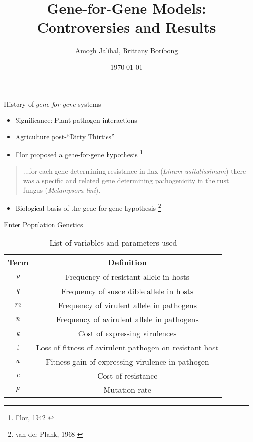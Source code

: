 \documentclass[presentation]{beamer}
\author[Boribong, Jalihal]{Amogh Jalihal, Brittany Boribong}
\date{\today}
\title{Gene-for-Gene Models: Controversies and Results}
\begin{document}
\maketitle
\begin{frame}[label=sec-1]{History of \emph{gene-for-gene} systems}
  \begin{itemize}
  \item Significance: Plant-pathogen interactions
  \item Agriculture post-``Dirty Thirties''
  \item Flor proposed a gene-for-gene hypothesis \footnote{\tiny{Flor, 1942 \cite{flor1942complementary}}}
  \end{itemize}
    \begin{quotation}
      ...for each gene determining resistance in flax (\emph{Linum usitatissimum}) there was a specific and related gene determining pathogenicity in the rust fungus (\emph{Melampsora lini}). 
    \end{quotation}
    \begin{itemize}
    \item Biological basis of the gene-for-gene hypothesis \footnote{\tiny{van der Plank, 1968 \cite{vanderplank1968disease}}}
    \end{itemize}
\end{frame}
\begin{frame}[label=sec-2]{Enter Population Genetics}
\begin{table}[h!]
\centering
\begin{tabular}{|c|c|}
\hline
\textbf{Term} & \textbf{Definition} \\
\hline
$p$ & Frequency of resistant allele in hosts \\
$q$ & Frequency of susceptible allele in hosts \\
$m$ & Frequency of virulent allele in pathogens\\
$n$ & Frequency of avirulent allele in pathogens\\
$k$ & Cost of expressing virulences\\
$t$ & Loss of fitness of avirulent pathogen on resistant host\\
$a$ & Fitness gain of expressing virulence in pathogen\\
$c$ & Cost of resistance\\
$\mu$ & Mutation rate\\
\hline
\end{tabular}
\caption{List of variables and parameters used}
\label{tab:parlist}
\end{table}
\end{frame}
\end{document}
